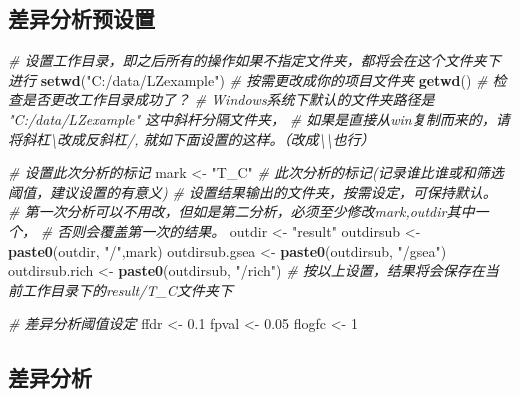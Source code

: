 \documentclass[
]{book}
\newenvironment{Shaded}{\begin{snugshade}}{\end{snugshade}}
\newcommand{\CommentTok}[1]{\textcolor[rgb]{0.56,0.35,0.01}{\textit{#1}}}
\newcommand{\DecValTok}[1]{\textcolor[rgb]{0.00,0.00,0.81}{#1}}
\newcommand{\FloatTok}[1]{\textcolor[rgb]{0.00,0.00,0.81}{#1}}
\newcommand{\FunctionTok}[1]{\textcolor[rgb]{0.13,0.29,0.53}{\textbf{#1}}}
\newcommand{\NormalTok}[1]{#1}
\newcommand{\OtherTok}[1]{\textcolor[rgb]{0.56,0.35,0.01}{#1}}
\newcommand{\StringTok}[1]{\textcolor[rgb]{0.31,0.60,0.02}{#1}}
\begin{document}
\subsection{差异分析预设置}\label{ux5deeux5f02ux5206ux6790ux9884ux8bbeux7f6e}

\begin{Shaded}
\begin{Highlighting}[]
\CommentTok{\# 设置工作目录，即之后所有的操作如果不指定文件夹，都将会在这个文件夹下进行}
\FunctionTok{setwd}\NormalTok{(}\StringTok{"C:/data/LZexample"}\NormalTok{)  }\CommentTok{\# 按需更改成你的项目文件夹}
\FunctionTok{getwd}\NormalTok{() }\CommentTok{\# 检查是否更改工作目录成功了？}
\CommentTok{\# Windows系统下默认的文件夹路径是 "C:/data/LZexample" 这中斜杆分隔文件夹，}
\CommentTok{\# 如果是直接从win复制而来的，请将斜杠\textbackslash{}改成反斜杠/, 就如下面设置的这样。（改成\textbackslash{}\textbackslash{}也行）}

\CommentTok{\# 设置此次分析的标记}
\NormalTok{mark }\OtherTok{\textless{}{-}} \StringTok{"T\_C"}  \CommentTok{\# 此次分析的标记(记录谁比谁或和筛选阈值，建议设置的有意义)}
\CommentTok{\# 设置结果输出的文件夹，按需设定，可保持默认。}
\CommentTok{\#  第一次分析可以不用改，但如是第二分析，必须至少修改mark,outdir其中一个，}
\CommentTok{\#  否则会覆盖第一次的结果。}
\NormalTok{outdir }\OtherTok{\textless{}{-}} \StringTok{"result"}  
\NormalTok{outdirsub }\OtherTok{\textless{}{-}} \FunctionTok{paste0}\NormalTok{(outdir, }\StringTok{"/"}\NormalTok{,mark)}
\NormalTok{outdirsub.gsea }\OtherTok{\textless{}{-}} \FunctionTok{paste0}\NormalTok{(outdirsub, }\StringTok{"/gsea"}\NormalTok{)}
\NormalTok{outdirsub.rich }\OtherTok{\textless{}{-}} \FunctionTok{paste0}\NormalTok{(outdirsub, }\StringTok{"/rich"}\NormalTok{)}
\CommentTok{\# 按以上设置，结果将会保存在当前工作目录下的result/T\_C文件夹下}

\CommentTok{\# 差异分析阈值设定}
\NormalTok{ffdr }\OtherTok{\textless{}{-}} \FloatTok{0.1}
\NormalTok{fpval }\OtherTok{\textless{}{-}} \FloatTok{0.05}
\NormalTok{flogfc }\OtherTok{\textless{}{-}} \DecValTok{1}
\end{Highlighting}
\end{Shaded}

\subsection{差异分析}\label{ux5deeux5f02ux5206ux6790}
\end{document}
